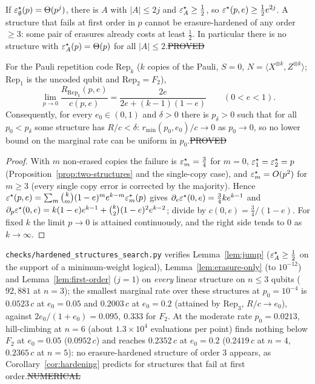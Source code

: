 \begin{corollary}\label{cor:hardening}
If $\varepsilon^{\star}_\emptyset(p)=\Theta(p^j)$, there is $A$ with $|A|\le2j$ and $\varepsilon^{\star}_A\ge\tfrac12$, so $\varepsilon^{\star}(p,e)\ge\tfrac12e^{2j}$. A structure that fails at first order in $p$ cannot be erasure-hardened of any order $\ge3$: some pair of erasures already costs at least $\tfrac12$. In particular there is no structure with $\varepsilon^{\star}_A(p)=\Theta(p)$ for all $|A|\le2$.\hfill\st{PROVED}
\end{corollary}

\begin{proposition}\label{prop:rate-small-p}
For the Pauli repetition code $\mathrm{Rep}_k$ ($k$ copies of the Pauli, $S=0$, $N=\langle X^{\otimes k},Z^{\otimes k}\rangle$; $\mathrm{Rep}_1$ is the uncoded qubit and $\mathrm{Rep}_2=F_2$),
\[
\lim_{p\to0}\frac{R_{\mathrm{Rep}_k}(p,e)}{c(p,e)}=\frac{2e}{2e+(k-1)(1-e)}\qquad(0<e<1).
\]
Consequently, for every $e_0\in(0,1)$ and $\delta>0$ there is $p_\delta>0$ such that for all $p_0<p_\delta$ some structure has $R/c<\delta$: $r_{\min}(p_0,e_0)/c\to0$ as $p_0\to0$, so no lower bound on the marginal rate can be uniform in $p_0$.\hfill\st{PROVED}
\end{proposition}
\begin{proof}
With $m$ non-erased copies the failure is $\varepsilon^{\star}_m=\tfrac34$ for $m=0$, $\varepsilon^{\star}_1=\varepsilon^{\star}_2=p$ (Proposition~\ref{prop:two-structures} and the single-copy case), and $\varepsilon^{\star}_m=O(p^2)$ for $m\ge3$ (every single copy error is corrected by the majority). Hence
$\varepsilon^{\star}(p,e)=\sum_m\binom km(1-e)^me^{k-m}\varepsilon^{\star}_m(p)$ gives $\partial_e\varepsilon^{\star}(0,e)=\tfrac34ke^{k-1}$ and
$\partial_p\varepsilon^{\star}(0,e)=k(1-e)e^{k-1}+\binom k2(1-e)^2e^{k-2}$; divide by $c(0,e)=\tfrac34/(1-e)$. For fixed $k$ the limit $p\to0$ is attained continuously, and the right side tends to $0$ as $k\to\infty$.
\end{proof}

\begin{observation}\label{obs:hardened}
\texttt{checks/hardened\_structures\_search.py} verifies Lemma~\ref{lem:jump} ($\varepsilon^{\star}_A\ge\tfrac12$ on the support of a minimum-weight logical), Lemma~\ref{lem:erasure-only} (to $10^{-12}$) and Lemma~\ref{lem:first-order} ($j=1$) on \emph{every} linear structure on $n\le3$ qubits ($92{,}881$ at $n=3$); the smallest marginal rate over these structures at $p_0=10^{-4}$ is $0.0523\,c$ at $e_0=0.05$ and $0.2003\,c$ at $e_0=0.2$ (attained by $\mathrm{Rep}_3$, $R/c\to e_0$), against $2e_0/(1+e_0)=0.095,\ 0.333$ for $F_2$. At the moderate rate $p_0=0.0213$, hill-climbing at $n=6$ (about $1.3\times10^4$ evaluations per point) finds nothing below $F_2$ at $e_0=0.05$ ($0.0952\,c$) and reaches $0.2352\,c$ at $e_0=0.2$ ($0.2419\,c$ at $n=4$, $0.2365\,c$ at $n=5$): no erasure-hardened structure of order $3$ appears, as Corollary~\ref{cor:hardening} predicts for structures that fail at first order.\hfill\st{NUMERICAL}
\end{observation}

